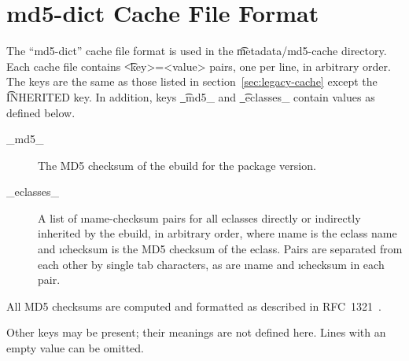 \section{md5-dict Cache File Format}

The ``md5-dict'' cache file format is used in the \t{metadata/md5-cache} directory. Each cache file
contains \t{<key>=<value>} pairs, one per line, in arbitrary order. The keys are the same as those
listed in section~\ref{sec:legacy-cache} except the \t{INHERITED} key. In addition, keys \t{_md5_}
and \t{_eclasses_} contain values as defined below.

\begin{description}
\item[_md5_] The MD5 checksum of the ebuild for the package version.

\item[_eclasses_] A list of \i{name-checksum} pairs for all eclasses directly or indirectly
inherited by the ebuild, in arbitrary order, where \i{name} is the eclass name and \i{checksum}
is the MD5 checksum of the eclass. Pairs are separated from each other by single tab characters,
as are \i{name} and \i{checksum} in each pair.
\end{description}

All MD5 checksums are computed and formatted as described in RFC~1321~\cite{rfc1321}.

Other keys may be present; their meanings are not defined here. Lines with an empty value can be
omitted.


